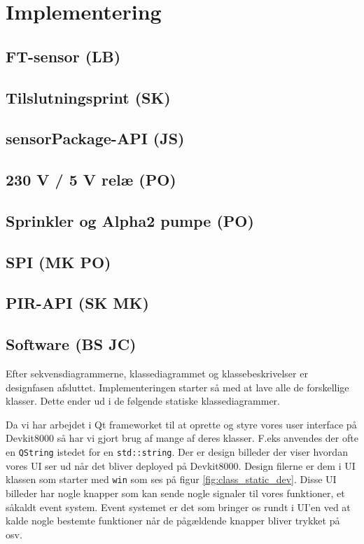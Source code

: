 \chapter{Implementering}

\section{FT-sensor (LB)}


\section{Tilslutningsprint (SK)}


\section{sensorPackage-API (JS)}


\section{230 V / 5 V relæ (PO)}


\section{Sprinkler og Alpha2 pumpe (PO)}


\newpage
\section{SPI (MK PO)}


\section{PIR-API (SK MK)}


\section{Software (BS JC)}
Efter sekvensdiagrammerne, klassediagrammet og klassebeskrivelser er designfasen afsluttet. Implementeringen starter så med at lave alle de forskellige klasser. Dette ender ud i de følgende statiske klassediagrammer.

Da vi har arbejdet i Qt frameworket til at oprette og styre vores user interface på Devkit8000 så har vi gjort brug af mange af deres klasser. F.eks anvendes der ofte en \verb+QString+ istedet for en \verb+std::string+. Der er design billeder der viser hvordan vores UI ser ud når det bliver deployed på Devkit8000. Design filerne er dem i UI klassen som starter med \verb+win+ som ses på figur \ref{fig:class_static_dev}. Disse UI billeder har nogle knapper som kan sende nogle signaler til vores funktioner, et såkaldt event system. Event systemet er det som bringer os rundt i UI'en ved at kalde nogle bestemte funktioner når de pågældende knapper bliver trykket på osv.

